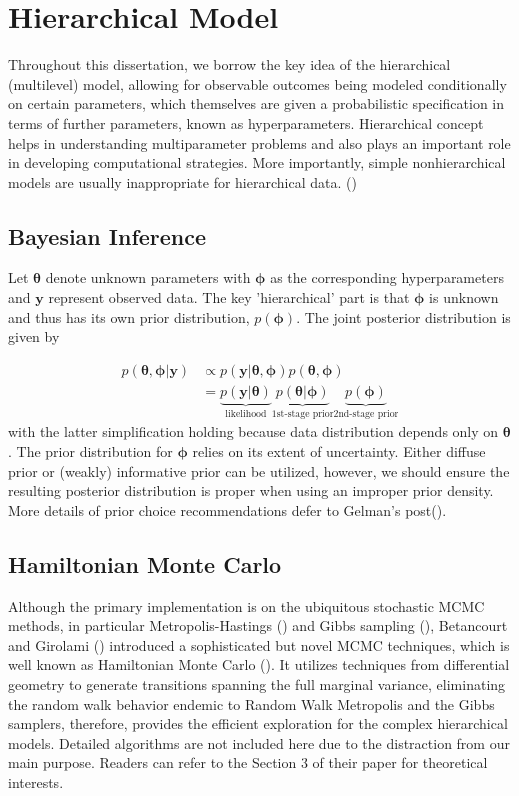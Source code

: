 \section{Hierarchical Model}

Throughout this dissertation, we borrow the key idea of the hierarchical (multilevel) model, allowing for observable outcomes being modeled conditionally on certain parameters, which themselves are given a probabilistic specification in terms of further parameters, known as hyperparameters. Hierarchical concept helps in understanding multiparameter problems and also plays an important role in developing computational strategies. More importantly, simple nonhierarchical models are usually inappropriate for hierarchical data. (\cite{Gelman2013a})


\subsection{Bayesian Inference}

Let $\bm{\theta}$ denote unknown parameters with $\bm{\phi}$ as the corresponding hyperparameters and $\bm{y}$ represent observed data. The key 'hierarchical' part is that $\bm{\phi}$ is unknown and thus has its own prior distribution, $p(\bm{\phi})$. The joint posterior distribution is given by 

\begin{align}
    p(\bm{\theta, \phi}|\bm{y}) & \propto p(\bm{y}|\bm{\theta,\phi})p(\bm{\theta,\phi}) \\
    & =\underbrace{p(\bm{y}|\bm{\theta})}_\text{likelihood} \underbrace{p(\bm{\theta}|\bm{\phi})}_\text{1st-stage prior} \underbrace{p(\bm{\phi})}_\text{2nd-stage prior} \nonumber
\end{align}
with the latter simplification holding because data distribution depends only on $\bm{\theta}$. The prior distribution for $\bm{\phi}$ relies on its extent of uncertainty. Either diffuse prior or (weakly) informative prior can be utilized, however, we should ensure the resulting posterior distribution is proper when using an improper prior density. More details of prior choice recommendations defer to Gelman's post(\cite{Gelman2020}). 


\subsection{Hamiltonian Monte Carlo}

Although the primary implementation is on the ubiquitous stochastic MCMC methods, in particular Metropolis-Hastings (\cite{Hastings1970}) and Gibbs sampling (\cite{Gelfand1990}), Betancourt and Girolami (\cite{Betancourt2013}) introduced a sophisticated but novel MCMC techniques, which is well known as Hamiltonian Monte Carlo (\cite{Neal2011}). It utilizes techniques from differential geometry to generate transitions spanning the full marginal variance, eliminating the random walk behavior endemic to Random Walk Metropolis and the Gibbs samplers, therefore, provides the efficient exploration for the complex hierarchical models. Detailed algorithms are not included here due to the distraction from our main purpose. Readers can refer to the Section 3 of their paper for theoretical interests.  

